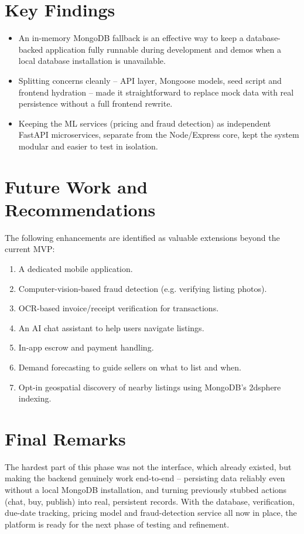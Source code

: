 \documentclass[12pt]{report}
\begin{document}
\section{Key Findings}
\begin{itemize}
    \item An in-memory MongoDB fallback is an effective way to keep a database-backed
    application fully runnable during development and demos when a local database
    installation is unavailable.
    \item Splitting concerns cleanly -- API layer, Mongoose models, seed script and frontend
    hydration -- made it straightforward to replace mock data with real persistence without a
    full frontend rewrite.
    \item Keeping the ML services (pricing and fraud detection) as independent FastAPI
    microservices, separate from the Node/Express core, kept the system modular and easier to
    test in isolation.
\end{itemize}

\section{Future Work and Recommendations}
The following enhancements are identified as valuable extensions beyond the current MVP:
\begin{enumerate}
    \item A dedicated mobile application.
    \item Computer-vision-based fraud detection (e.g. verifying listing photos).
    \item OCR-based invoice/receipt verification for transactions.
    \item An AI chat assistant to help users navigate listings.
    \item In-app escrow and payment handling.
    \item Demand forecasting to guide sellers on what to list and when.
    \item Opt-in geospatial discovery of nearby listings using MongoDB's 2dsphere indexing.
\end{enumerate}

\section{Final Remarks}
The hardest part of this phase was not the interface, which already existed, but making the
backend genuinely work end-to-end -- persisting data reliably even without a local MongoDB
installation, and turning previously stubbed actions (chat, buy, publish) into real,
persistent records. With the database, verification, due-date tracking, pricing model and
fraud-detection service all now in place, the platform is ready for the next phase of testing
and refinement.
\end{document}
